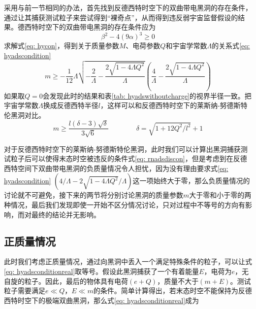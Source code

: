 采用与前一节相同的办法，首先找到反德西特时空下的双曲带电黑洞的存在条件，通过让其捕获测试粒子来尝试得到“裸奇点”，从而得到违反弱宇宙监督假设的结果。德西特时空下的双曲带电黑洞的存在条件应为
\begin{equation}\label{eq: hycon}
    \beta^2-4 \left(9\alpha\right)^3 \geq 0
\end{equation}
求解式\eqref{eq: hycon}，得到关于质量参数$M$、电荷参数$Q$和宇宙学常数$\Lambda$的关系式\eqref{eq: hyadscondition}
\begin{equation}\label{eq: hyadscondition}
    m \geq -\frac{1}{12} \Lambda  \sqrt{-\frac{2}{\Lambda }-\frac{2 \sqrt{1-4 \Lambda  Q^2}}{\Lambda }} \left(\frac{4}{\Lambda }-\frac{2 \sqrt{1-4 \Lambda 
    Q^2}}{\Lambda }\right)
\end{equation}
如果取$Q=0$会发现此时的结果和表\ref{tab: hyadswithoutcharge}的视界半径一致。把宇宙学常数$\Lambda$换成反德西特半径$l$，这样可以和反德西特时空下的莱斯纳-努德斯特伦黑洞对比。
\begin{equation}\label{eq: hyadsconditionreal}
    m\geq \frac{l\left(\delta-3\right)\sqrt{\delta}}{3\sqrt{6}} \qquad \qquad \delta=\sqrt{1+12Q^2/l^2}+1
\end{equation}

对于反德西特时空下的莱斯纳-努德斯特伦黑洞，此时我们可以计算出黑洞捕获测试粒子后可以使得末态时空被违反的条件式\eqref{eq: rnadsdiscon}，但是考虑到在反德西特空间下双曲带电黑洞的负质量情况令人担忧，因为没有理由要求式\eqref{eq: hyadscondition} $\left(4/\Lambda -2 \sqrt{1-4 \Lambda Q^2}/\Lambda \right)$这一项始终大于零，那么负质量情况的讨论就不可避免，接下来的两节将分别讨论黑洞的质量参数$m$大于零和小于零的两种情况，最后我们发现即使一开始不区分情况讨论，只对过程中不等号的方向有影响，而对最终的结论并无影响。
\subsection{正质量情况}
此时我们考虑正质量情况，通过向黑洞中丢入一个满足特殊条件的粒子，可以让式\eqref{eq: hyadsconditionreal}取等号。假设此黑洞捕获了一个有着能量$E$，电荷为$e$，无自旋的粒子。因此，最后的物体具有电荷$\left(e+Q\right)$，质量不大于$\left(m+E\right)$。测试粒子需要满足$e\ll Q$，$E\ll m$的条件。简单计算得出，若末态时空不能保持为反德西特时空下的极端双曲黑洞，那么式\eqref{eq: hyadsconditionreal}成为
